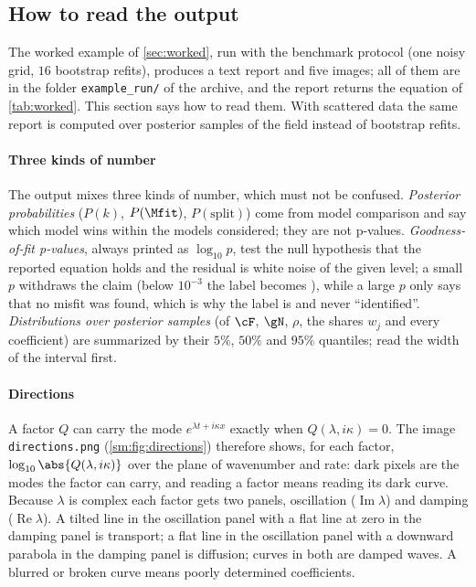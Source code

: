 \subsection{How to read the output}\label{sm:reading}
The worked example of \cref{sec:worked}, run with the benchmark protocol (one noisy grid, $16$ bootstrap refits),
produces a text report and five images; all of them are in the folder \texttt{example\_run/} of the archive, and the
report returns the equation of \cref{tab:worked}. This section says how to read them. With scattered data the same
report is computed over posterior samples of the field instead of bootstrap refits.

\paragraph{Three kinds of number} The output mixes three kinds of number, which must not be confused.
\emph{Posterior probabilities} ($P(k)$, $P(\Mfit)$, $P(\text{split})$) come from model comparison and say which model wins
within the models considered; they are not p-values. \emph{Goodness-of-fit p-values}, always printed as $\log_{10}p$, test
the null hypothesis that the reported equation holds and the residual is white noise of the given level; a small $p$
withdraws the claim (below $10^{-3}$ the label becomes \MIS), while a large $p$ only says that no misfit was found, which
is why the label is \FC{} and never ``identified''. \emph{Distributions over posterior samples} (of $\cF$, $\gN$, $\rho$,
the shares $w_j$ and every coefficient) are summarized by their $5\%$, $50\%$ and $95\%$ quantiles; read the width of the
interval first.

\paragraph{Directions} A factor $Q$ can carry the mode $e^{\lambda t+i\kappa x}$ exactly when $Q(\lambda,i\kappa)=0$. The image
\texttt{directions.png} (\cref{sm:fig:directions}) therefore shows, for each factor, $\log_{10}\abs{Q(\lambda,i\kappa)}$ over the
plane of wavenumber and rate: dark pixels are the modes the factor can carry, and reading a factor means reading its
dark curve. Because $\lambda$ is complex each factor gets two panels, oscillation ($\operatorname{Im}\lambda$) and damping
($\operatorname{Re}\lambda$). A tilted line in the oscillation panel with a flat line at zero in the damping panel is
transport; a flat line in the oscillation panel with a downward parabola in the damping panel is diffusion; curves in
both are damped waves. A blurred or broken curve means poorly determined coefficients.

